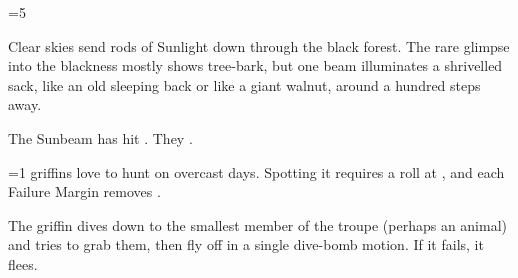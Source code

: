 \ifnum\value{cycle}=5

\begin{boxtext}
  Clear skies send rods of Sunlight down through the black forest.
  The rare glimpse into the blackness mostly shows tree-bark, but one beam illuminates a shrivelled sack, like an old sleeping back or like a giant walnut, around a hundred \glspl{step} away.
\end{boxtext}

The Sunbeam has hit .
They .

\else
  \ifnum\value{temperature}=1
    \Glspl{griffin} love to hunt on overcast days.
    Spotting it requires a  roll at \tn[12], and each Failure Margin removes .


    The \gls{griffin} dives down to the smallest member of the troupe (perhaps an animal) and tries to grab them, then fly off in a single dive-bomb motion.
    If it fails, it flees.

  \fi

\fi


